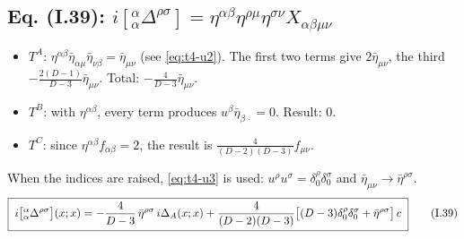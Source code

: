 \subsection{Eq. (I.39): \texorpdfstring{$i[{}^\alpha_\alpha\Delta^{\rho\sigma}]=\eta^{\alpha\beta}\eta^{\rho\mu}\eta^{\sigma\nu}X_{\alpha\beta\mu\nu}$}{the single trace} \texorpdfstring{\tD}{}}
\begin{itemize}
\item \(T^A\): \(\eta^{\alpha\beta}\bar\eta_{\alpha\mu}\bar\eta_{\nu\beta}=\bar\eta_{\mu\nu}\) (see
\eqref{eq:t4-u2}). The first two terms give \(2\bar\eta_{\mu\nu}\), the third
\(-\tfrac{2(D-1)}{D-3}\bar\eta_{\mu\nu}\). Total: \(-\tfrac{4}{D-3}\bar\eta_{\mu\nu}\).
\item \(T^B\): with \(\eta^{\alpha\beta}\), every term produces \(u^\beta\bar\eta_{\beta\,\cdot}=0\).
Result: \(0\).
\item \(T^C\): since \(\eta^{\alpha\beta}f_{\alpha\beta}=2\), the result is
\(\tfrac{4}{(D-2)(D-3)}f_{\mu\nu}\).
\end{itemize}
When the indices are raised, \eqref{eq:t4-u3} is used: \(u^\rho u^\sigma=\delta^\rho_0\delta^\sigma_0\)
and \(\bar\eta_{\mu\nu}\to\bar\eta^{\rho\sigma}\).
\begin{equation*}\label{eq:t4-I39}
\boxed{\;i\bigl[{}^\alpha_\alpha\Delta^{\rho\sigma}\bigr](x;x)=-\frac{4}{D-3}\,\bar\eta^{\rho\sigma}\,i\Delta_A(x;x)+\frac{4}{(D-2)(D-3)}\bigl[(D-3)\delta^\rho_0\delta^\sigma_0+\bar\eta^{\rho\sigma}\bigr]\,c\;}
\tag{I.39}
\end{equation*}

